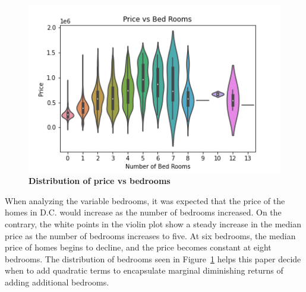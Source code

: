 \documentclass[12pt]{report}
\begin{document}
\begin{figure}[h]
\begin{center}
\includegraphics[width=130mm]{BedViolin.png}
\end{center}
\caption{\textbf{Distribution of price vs bedrooms}}
\label{fig:bedVio}
\end{figure}
When analyzing the variable bedrooms, it was expected that the price of the homes in D.C. would increase as the number of bedrooms increased. On the contrary, the white points in the violin plot show a steady increase in the median price as the number of bedrooms increases to five. At six bedrooms, the median price of homes begins to decline, and the price becomes constant at eight bedrooms. The distribution of bedrooms seen in Figure~\ref{fig:bedVio} helps this paper decide when to add quadratic terms to encapsulate marginal diminishing returns of adding additional bedrooms.
\clearpage
\end{document}
